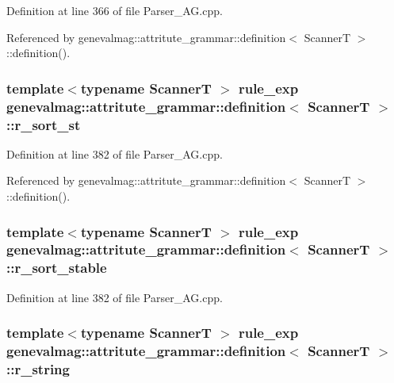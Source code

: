 Definition at line 366 of file Parser\_\-AG.cpp.



Referenced by genevalmag::attritute\_\-grammar::definition$<$ ScannerT $>$::definition().

\hypertarget{structgenevalmag_1_1attritute__grammar_1_1definition_a337605b1c4485d58daa5b7fddfbe9f1d}{
\subsubsection[{r\_\-sort\_\-st}]{\setlength{\rightskip}{0pt plus 5cm}template$<$typename ScannerT $>$ {\bf rule\_\-exp} {\bf genevalmag::attritute\_\-grammar::definition}$<$ ScannerT $>$::{\bf r\_\-sort\_\-st}}}
\label{structgenevalmag_1_1attritute__grammar_1_1definition_a337605b1c4485d58daa5b7fddfbe9f1d}


Definition at line 382 of file Parser\_\-AG.cpp.



Referenced by genevalmag::attritute\_\-grammar::definition$<$ ScannerT $>$::definition().

\hypertarget{structgenevalmag_1_1attritute__grammar_1_1definition_a13d84a11e23110be3df8f860537ec986}{
\subsubsection[{r\_\-sort\_\-stable}]{\setlength{\rightskip}{0pt plus 5cm}template$<$typename ScannerT $>$ {\bf rule\_\-exp} {\bf genevalmag::attritute\_\-grammar::definition}$<$ ScannerT $>$::{\bf r\_\-sort\_\-stable}}}
\label{structgenevalmag_1_1attritute__grammar_1_1definition_a13d84a11e23110be3df8f860537ec986}


Definition at line 382 of file Parser\_\-AG.cpp.

\hypertarget{structgenevalmag_1_1attritute__grammar_1_1definition_a46b0e2fa817970d2ad50aad55b987276}{
\subsubsection[{r\_\-string}]{\setlength{\rightskip}{0pt plus 5cm}template$<$typename ScannerT $>$ {\bf rule\_\-exp} {\bf genevalmag::attritute\_\-grammar::definition}$<$ ScannerT $>$::{\bf r\_\-string}}}
\label{structgenevalmag_1_1attritute__grammar_1_1definition_a46b0e2fa817970d2ad50aad55b987276}


